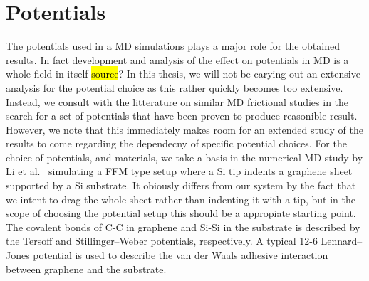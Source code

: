 






\section{Potentials}\label{sec:potentials}




The potentials used in a \acrshort{MD} simulations plays a major role for the
obtained results. In fact development and analysis of the effect on potentials
in \acrshort{MD} is a whole field in itself \hl{source}? In this thesis, we will
not be carying out an  extensive analysis for the potential choice as this
rather quickly becomes too extensive. Instead, we consult with the litterature
on similar \acrshort{MD} frictional studies in the search for a set of
potentials that have been proven to produce reasonible result. However, we note
that this immediately makes room for an extended study of the results to come
regarding the dependecny of specific potential choices. For the choice of
potentials, and materials, we take a basis in the numerical \acrshort{MD} study
by Li et al.\ \cite{li_evolving_2016} simulating a \acrshort{FFM} type setup
where a Si tip indents a graphene sheet supported by a Si substrate. It obiously
differs from our system by the fact that we intent to drag the whole sheet
rather than indenting it with a tip, but in the scope of choosing the potential
setup this should be a appropiate starting point. The covalent bonds of C-C in
graphene and Si-Si in the substrate is described by the Tersoff and
Stillinger–Weber potentials, respectively. A typical 12-6 Lennard–Jones
potential is used to describe the van der Waals adhesive interaction between
graphene and the substrate. 

